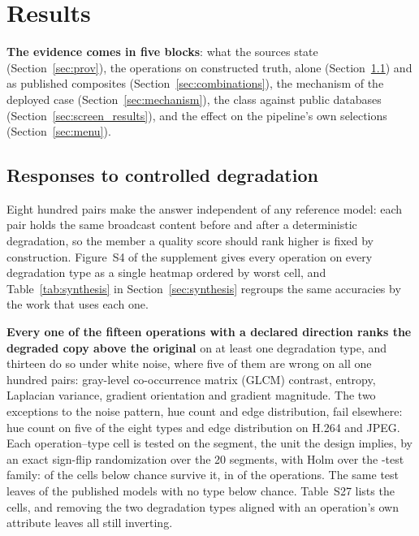 \section{Results}\label{sec:results}

\textbf{The evidence comes in five blocks}: what the sources state
(Section~\ref{sec:prov}), the operations on constructed truth, alone
(Section~\ref{sec:class}) and as published composites (Section~\ref{sec:combinations}),
the mechanism of the deployed case (Section~\ref{sec:mechanism}), the class against
public databases (Section~\ref{sec:screen_results}), and the effect on the pipeline's
own selections (Section~\ref{sec:menu}).

\subsection{Responses to controlled degradation}\label{sec:class}

Eight hundred pairs make the answer independent of any reference model: each pair holds
the same broadcast content before and after a deterministic degradation, so the member a
quality score should rank higher is fixed by construction. Figure~S4 of the supplement gives every operation on every degradation type as a single
heatmap ordered by worst cell, and Table~\ref{tab:synthesis} in
Section~\ref{sec:synthesis} regroups the same accuracies by the work that uses each one.

\textbf{Every one of the fifteen operations with a declared direction ranks the degraded
copy above the original} on at least one degradation type, and thirteen do so under white noise, where five of them are wrong on all one hundred pairs: gray-level co-occurrence matrix (GLCM) contrast, entropy, Laplacian
variance, gradient orientation and gradient
magnitude. The two exceptions
to the noise pattern, hue count and edge distribution, fail elsewhere: hue count on five of
the eight types and edge distribution on H.264 and JPEG. Each operation--type cell is tested on the segment, the unit the design implies, by an
exact sign-flip randomization over the 20 segments, with Holm over the
\invTestes{}-test family: \invSig{} of the \invCelulas{} cells below chance survive it, in
\invOpsSig{} of the \fontesDaLiteratura{} operations. The same test leaves
\invModelosLimpos{} of the \invModelos{} published models with no type below chance.  Table~S27 lists the \invCelulas{} cells, and removing the two degradation types aligned
with an operation's own attribute leaves all \tipoSemAlinhados{} still inverting.

